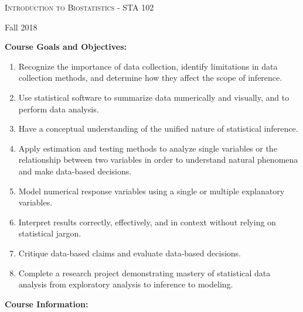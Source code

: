 \documentclass[11pt, a4paper]{article}
\begin{document}
\begin{center}
{\Large \textsc{Introduction to Biostatistics - STA 102}}
\end{center}
\begin{center}
Fall 2018
\end{center}

\noindent\textbf{Course Goals and Objectives:}  

\vspace{2mm}


\begin{enumerate}
\item Recognize the importance of data collection, identify limitations in data collection
methods, and determine how they affect the scope of inference.
\item Use statistical software to summarize data numerically and visually, and to perform data
analysis.
\item Have a conceptual understanding of the unified nature of statistical inference.
\item Apply estimation and testing methods to analyze single variables or the relationship
between two variables in order to understand natural phenomena and make data-based
decisions.
\item Model numerical response variables using a single or multiple explanatory variables.
\item Interpret results correctly, effectively, and in context without relying on statistical jargon.
\item Critique data-based claims and evaluate data-based decisions.
\item Complete a research project demonstrating mastery of statistical data analysis from
exploratory analysis to inference to modeling. 

\end{enumerate}

\noindent\textbf{Course Information:}
\end{document}
